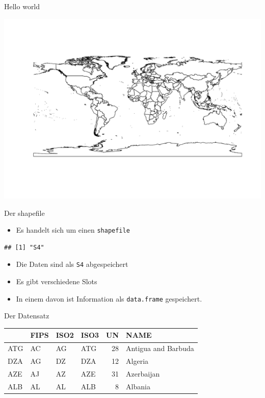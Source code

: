\documentclass[ignorenonframetext,]{beamer}
\providecommand{\tightlist}{%
  \setlength{\itemsep}{0pt}\setlength{\parskip}{0pt}}
\begin{document}
\begin{frame}{Hello world}

\includegraphics{Geomedizin_files/figure-beamer/unnamed-chunk-83-1.pdf}

\end{frame}

\begin{frame}[fragile]{Der shapefile}

\begin{itemize}
\tightlist
\item
  Es handelt sich um einen \texttt{shapefile}
\end{itemize}

\begin{verbatim}
## [1] "S4"
\end{verbatim}

\begin{itemize}
\tightlist
\item
  Die Daten sind als \texttt{S4} abgespeichert
\item
  Es gibt verschiedene Slots
\item
  In einem davon ist Information als \texttt{data.frame} gespeichert.
\end{itemize}

\end{frame}

\begin{frame}{Der Datensatz}

\begin{longtable}[]{@{}llllrl@{}}
\toprule
& FIPS & ISO2 & ISO3 & UN & NAME\tabularnewline
\midrule
\endhead
ATG & AC & AG & ATG & 28 & Antigua and Barbuda\tabularnewline
DZA & AG & DZ & DZA & 12 & Algeria\tabularnewline
AZE & AJ & AZ & AZE & 31 & Azerbaijan\tabularnewline
ALB & AL & AL & ALB & 8 & Albania\tabularnewline
\bottomrule
\end{longtable}

\end{frame}
\end{document}
